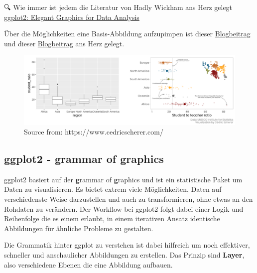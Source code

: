 \documentclass[
]{article}
\begin{document}
🔍 Wie immer ist jedem die Literatur von Hadly Wickham ans Herz gelegt \href{https://ggplot2-book.org/introduction.html}{ggplot2: Elegant Graphics for Data Analysis}

Über die Möglichkeiten eine Basis-Abbildung aufzupimpen ist dieser \href{https://www.cedricscherer.com/2019/05/17/the-evolution-of-a-ggplot-ep.-1/}{Blogbeitrag} und dieser \href{https://www.cedricscherer.com/2019/08/05/a-ggplot2-tutorial-for-beautiful-plotting-in-r/\#colors}{Blogbeitrag} ans Herz gelegt.

\begin{figure}

{\centering \includegraphics[width=12.89in]{images/053} 

}

\caption{Source from: https://www.cedricscherer.com/}\label{fig:unnamed-chunk-165}
\end{figure}

\hypertarget{ggplot2---grammar-of-graphics}{%
\subsection{ggplot2 - grammar of graphics}\label{ggplot2---grammar-of-graphics}}

ggplot2 basiert auf der \textbf{g}rammar of \textbf{g}raphics und ist ein statistische Paket um Daten zu visualisieren. Es bietet extrem viele Möglichkeiten, Daten auf verschiedenste Weise darzustellen und auch zu transformieren, ohne etwas an den Rohdaten zu verändern. Der Workflow bei ggplot2 folgt dabei einer Logik und Reihenfolge die es einem erlaubt, in einem iterativen Ansatz identische Abbildungen für ähnliche Probleme zu gestalten.

Die Grammatik hinter ggplot zu verstehen ist dabei hilfreich um noch effektiver, schneller und anschaulicher Abbildungen zu erstellen. Das Prinzip sind \textbf{Layer}, also verschiedene Ebenen die eine Abbildung aufbauen.
\end{document}

